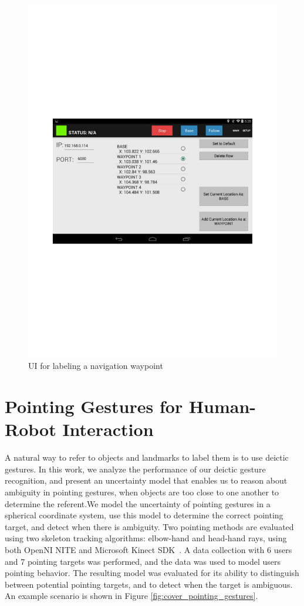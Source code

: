 \begin{figure}[ht!]
\centering
\includegraphics[width=1.0\textwidth]{pics/ui}
\caption{UI for labeling a navigation waypoint}
\label{fig:ui}
\end{figure}

\section{Pointing Gestures for Human-Robot Interaction}
\label{sec:pointing_gestures}

A natural way to refer to objects and landmarks to label them is to use deictic gestures. In this work, we analyze the performance of our deictic gesture recognition, and present an uncertainty model that enables us to reason about ambiguity in pointing gestures, when objects are too close to one another to determine the referent.We model the uncertainty of pointing gestures in a spherical coordinate system, use this model to determine the correct pointing target, and detect when there is ambiguity. Two pointing methods are evaluated using two skeleton tracking algorithms: elbow-hand and head-hand rays, using both OpenNI NITE and Microsoft Kinect SDK~\cite{shotton2011real}.  A data collection with 6 users and 7 pointing targets was performed, and the data was used to model users pointing behavior.  The resulting model was evaluated for its ability to distinguish between potential pointing targets, and to detect when the target is ambiguous.  An example scenario is shown in Figure \ref{fig:cover_pointing_gestures}.

